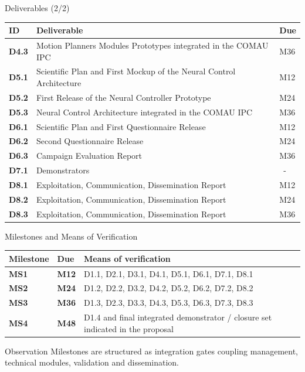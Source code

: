 \documentclass[aspectratio=169,10pt]{beamer}
\begin{document}
\begin{frame}{Deliverables (2/2)}

\scriptsize
\begin{tabularx}{\textwidth}{>{\bfseries}p{} X p{}}
\toprule
ID & Deliverable & Due \\
\midrule
D4.3 & Motion Planners Modules Prototypes integrated in the COMAU IPC & M36 \\
D5.1 & Scientific Plan and First Mockup of the Neural Control Architecture & M12 \\
D5.2 & First Release of the Neural Controller Prototype & M24 \\
D5.3 & Neural Control Architecture integrated in the COMAU IPC & M36 \\
D6.1 & Scientific Plan and First Questionnaire Release & M12 \\
D6.2 & Second Questionnaire Release & M24 \\
D6.3 & Campaign Evaluation Report & M36 \\
D7.1 & Demonstrators &~-~\\
D8.1 & Exploitation, Communication, Dissemination Report & M12 \\
D8.2 & Exploitation, Communication, Dissemination Report & M24 \\
D8.3 & Exploitation, Communication, Dissemination Report & M36 \\
\bottomrule
\end{tabularx}

\end{frame}


\begin{frame}{Milestones and Means of Verification}

\small
\begin{tabularx}{\textwidth}{>{\bfseries}p{} >{\bfseries}p{} X}
\toprule
Milestone & Due & Means of verification \\
\midrule
MS1 & M12 & D1.1, D2.1, D3.1, D4.1, D5.1, D6.1, D7.1, D8.1 \\
MS2 & M24 & D1.2, D2.2, D3.2, D4.2, D5.2, D6.2, D7.2, D8.2 \\
MS3 & M36 & D1.3, D2.3, D3.3, D4.3, D5.3, D6.3, D7.3, D8.3 \\
MS4 & M48 & D1.4 and final integrated demonstrator / closure set indicated in the proposal \\
\bottomrule
\end{tabularx}
\begin{block}{Observation}
Milestones are structured as integration gates coupling management, technical modules, validation and dissemination.
\end{block}

\end{frame}
\end{document}
